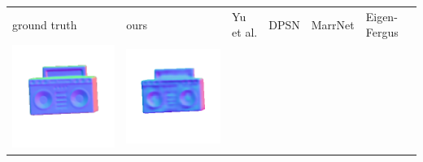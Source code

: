 \begin{tabularx}{\linewidth}{@{}Y@{}Y@{}Y@{}Y@{}Y@{}Y@{}}
ground truth & ours & Yu et al. & DPSN & MarrNet & Eigen-Fergus \\
\includegraphics[width=\linewidth]{semisynthetic/20160617_19_gt.png} &
\includegraphics[width=\linewidth]{semisynthetic/20160617_19_ours_out.png} &

\end{tabularx}
